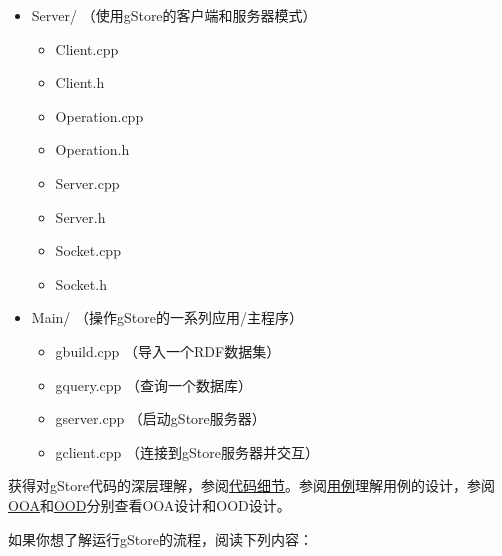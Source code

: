 \documentclass[titlepage, a4paper, 12pt]{article}
\begin{document}

\begin{itemize}
	\item
	Server/ （使用gStore的客户端和服务器模式）
	
	\begin{itemize}
		\item
		Client.cpp
		\item
		Client.h
		\item
		Operation.cpp
		\item
		Operation.h
		\item
		Server.cpp
		\item
		Server.h
		\item
		Socket.cpp
		\item
		Socket.h
	\end{itemize}
	\item
	Main/ （操作gStore的一系列应用/主程序）
	
	\begin{itemize}
		\item
		gbuild.cpp （导入一个RDF数据集）
		\item
		gquery.cpp （查询一个数据库）
		\item
		gserver.cpp （启动gStore服务器）
		\item
		gclient.cpp （连接到gStore服务器并交互）
	\end{itemize}
\end{itemize}


获得对gStore代码的深层理解，参阅\href{run:../pdf/code_overview.pdf}{代码细节}。参阅\href{run:../pdf/Gstore2.0_useCaseDoc.pdf}{用例}理解用例的设计，参阅\href{run:../pdf/OOA_class.pdf}{OOA}和\href{run:../pdf/OOD_class.pdf}{OOD}分别查看OOA设计和OOD设计。

如果你想了解运行gStore的流程，阅读下列内容：
\end{document}
